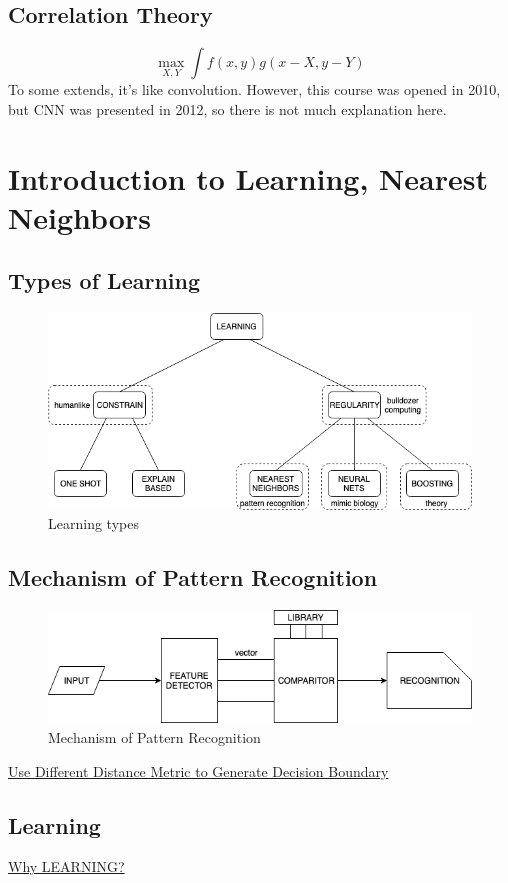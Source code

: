 \documentclass[12pt]{book}
\begin{document}
\subsection{Correlation  Theory}
$$\max_{X,Y}\int f(x,y)g(x-X,y-Y)$$
\indent To some extends, it's like convolution. However, this course was opened in 2010, but CNN was presented in 2012, so there is not much explanation here.
\newpage

\section{Introduction to Learning, Nearest Neighbors}
\subsection{Types of Learning}
\begin{figure}[ht]
	\centering
	\includegraphics[scale=0.7]{Figure/Figure10_1.png}
	\caption{Learning types}
\end{figure}
\subsection{Mechanism of Pattern Recognition}
\begin{figure}[ht]
	\centering
	\includegraphics[scale=0.7]{Figure/Figure10_2.png}
	\caption{Mechanism of Pattern Recognition}
\end{figure}
\href{https://www.youtube.com/watch?time_continue=4&v=09mb78oiPkA#t=9m00s}{Use Different Distance Metric to Generate Decision Boundary}
\subsection{Learning}
\href{https://www.youtube.com/watch?time_continue=4&v=09mb78oiPkA#t=24m18s}{Why LEARNING?}
\newpage
\end{document}
